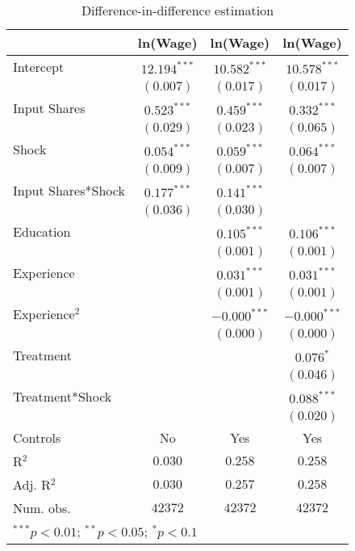 
\begin{table}[H]
\caption{Difference-in-difference estimation}
\begin{center}
\begin{tabular}{l c c c}
\hline
 & ln(Wage) & ln(Wage) & ln(Wage) \\
\hline
Intercept          & $12.194^{***}$ & $10.582^{***}$ & $10.578^{***}$ \\
                   & $(0.007)$      & $(0.017)$      & $(0.017)$      \\
Input Shares       & $0.523^{***}$  & $0.459^{***}$  & $0.332^{***}$  \\
                   & $(0.029)$      & $(0.023)$      & $(0.065)$      \\
Shock              & $0.054^{***}$  & $0.059^{***}$  & $0.064^{***}$  \\
                   & $(0.009)$      & $(0.007)$      & $(0.007)$      \\
Input Shares*Shock & $0.177^{***}$  & $0.141^{***}$  &                \\
                   & $(0.036)$      & $(0.030)$      &                \\
Education          &                & $0.105^{***}$  & $0.106^{***}$  \\
                   &                & $(0.001)$      & $(0.001)$      \\
Experience         &                & $0.031^{***}$  & $0.031^{***}$  \\
                   &                & $(0.001)$      & $(0.001)$      \\
Experience$^2$     &                & $-0.000^{***}$ & $-0.000^{***}$ \\
                   &                & $(0.000)$      & $(0.000)$      \\
Treatment          &                &                & $0.076^{*}$    \\
                   &                &                & $(0.046)$      \\
Treatment*Shock    &                &                & $0.088^{***}$  \\
                   &                &                & $(0.020)$      \\
\hline
Controls           & No             & Yes            & Yes            \\
R$^2$              & $0.030$        & $0.258$        & $0.258$        \\
Adj. R$^2$         & $0.030$        & $0.257$        & $0.258$        \\
Num. obs.          & $42372$        & $42372$        & $42372$        \\
\hline
\multicolumn{4}{l}{\scriptsize{$^{***}p<0.01$; $^{**}p<0.05$; $^{*}p<0.1$}}
\end{tabular}
\label{table:coefficients}
\end{center}
\end{table}
